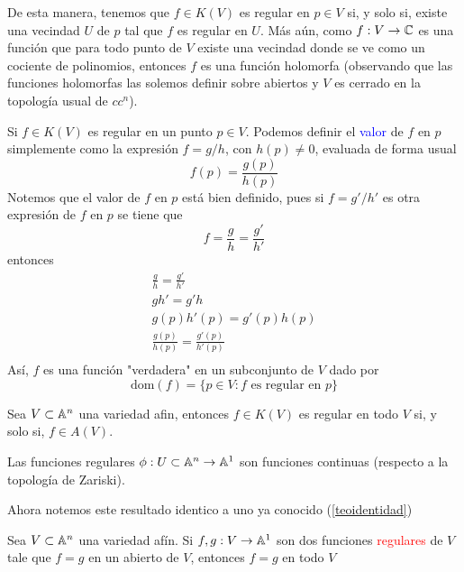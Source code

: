     De esta manera, tenemos que $f\in K(V)$ es regular en $p\in V$ si, y solo si, existe una vecindad $U$ de $p$ tal que $f$ es regular en $U$. Más aún, como $f:V\to\mathbb{C}$ es una función que para todo punto de $V$ existe una vecindad donde se ve como un cociente de polinomios, entonces $f$ es una función holomorfa (observando que las funciones holomorfas las solemos definir sobre abiertos y $V$ es cerrado en la topología usual de $cc^n$). 
    \begin{remark}
        Si $f\in K(V)$ es regular en un punto $p\in V$. Podemos definir el \textcolor{blue}{valor} de $f$ en $p$ simplemente como la expresión $f=g/h$, con $h(p)\neq 0$, evaluada de forma usual
        \begin{equation*}
            f(p)=\frac{g(p)}{h(p)}
        \end{equation*}
        Notemos que el valor de $f$ en $p$ está bien definido, pues si $f=g'/h'$ es otra expresión de $f$ en $p$ se tiene que 
        \begin{equation*}
            f=\frac{g}{h}=\frac{g'}{h'}
        \end{equation*}
        entonces
        \begin{gather*}
            \frac{g}{h}=\frac{g'}{h'}\\
            gh'=g'h\\
            g(p)h'(p)=g'(p)h(p)\\
            \frac{g(p)}{h(p)}=\frac{g'(p)}{h'(p)}\\
        \end{gather*}
        Así, $f$ es una función "verdadera" en un subconjunto de $V$ dado por
        \begin{equation*}
            \mathrm{dom}(f)=\{p\in V:f\text{ es regular en }p\}
        \end{equation*}
    \end{remark}

    

    \begin{propo}
        Sea $V\subset\mathbb{A}^n$ una variedad afin, entonces $f\in K(V)$ es regular en todo $V$ si, y solo si, $f\in A(V)$.
    \end{propo}

    \begin{propo}
        Las funciones regulares $\phi:U\subset\mathbb{A}^n\to \mathbb{A}^1$ son funciones continuas (respecto a la topología de Zariski).
    \end{propo}

    Ahora notemos este resultado identico a uno ya conocido (\ref{teoidentidad})
    \begin{corollary}\label{teoidetidadvarafin}
        Sea $V\subset \mathbb{A}^n$ una variedad afín. Si $f,g:V\to \mathbb{A}^1$ son dos funciones \textcolor{red}{regulares} de $V$ tale que $f=g$ en un abierto de $V$, entonces $f=g$ en todo $V$
    \end{corollary}
    
